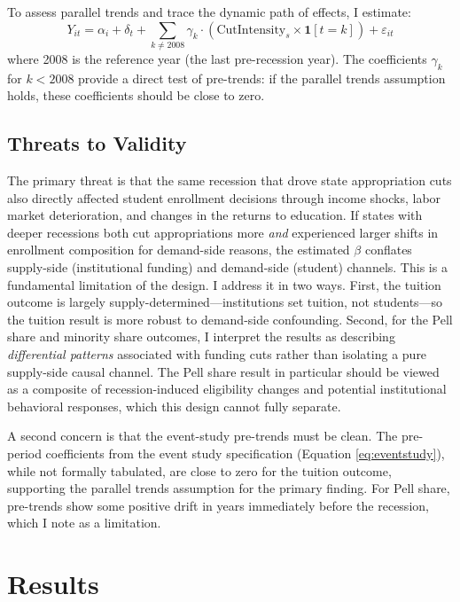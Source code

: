 \documentclass[12pt]{article}
\begin{document}
To assess parallel trends and trace the dynamic path of effects, I estimate:
\begin{equation}
Y_{it} = \alpha_i + \delta_t + \sum_{k \neq 2008} \gamma_k \cdot (\text{CutIntensity}_s \times \mathbf{1}[t = k]) + \varepsilon_{it}
\label{eq:eventstudy}
\end{equation}
where 2008 is the reference year (the last pre-recession year). The coefficients $\gamma_k$ for $k < 2008$ provide a direct test of pre-trends: if the parallel trends assumption holds, these coefficients should be close to zero.

\subsection{Threats to Validity}

The primary threat is that the same recession that drove state appropriation cuts also directly affected student enrollment decisions through income shocks, labor market deterioration, and changes in the returns to education. If states with deeper recessions both cut appropriations more \textit{and} experienced larger shifts in enrollment composition for demand-side reasons, the estimated $\beta$ conflates supply-side (institutional funding) and demand-side (student) channels. This is a fundamental limitation of the design. I address it in two ways. First, the tuition outcome is largely supply-determined---institutions set tuition, not students---so the tuition result is more robust to demand-side confounding. Second, for the Pell share and minority share outcomes, I interpret the results as describing \textit{differential patterns} associated with funding cuts rather than isolating a pure supply-side causal channel. The Pell share result in particular should be viewed as a composite of recession-induced eligibility changes and potential institutional behavioral responses, which this design cannot fully separate.

A second concern is that the event-study pre-trends must be clean. The pre-period coefficients from the event study specification (Equation \ref{eq:eventstudy}), while not formally tabulated, are close to zero for the tuition outcome, supporting the parallel trends assumption for the primary finding. For Pell share, pre-trends show some positive drift in years immediately before the recession, which I note as a limitation.

\section{Results}
\end{document}
